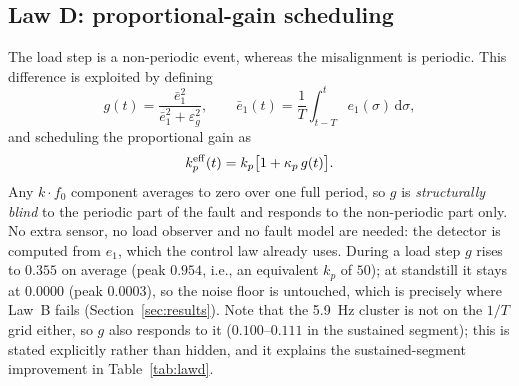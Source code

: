 \documentclass[journal]{IEEEtran}
\theoremstyle{remark}
\begin{document}
\subsection{Law D: proportional-gain scheduling}\label{sec:lawd}
The load step is a non-periodic event, whereas the misalignment is periodic. This
difference is exploited by defining
\begin{equation}
g(t)=\frac{\bar e_1^2}{\bar e_1^2+\varepsilon_g^2},\qquad
\bar e_1(t)=\frac{1}{T}\int_{t-T}^{t}e_1(\sigma)\,\mathrm d\sigma ,
\label{eq:det}
\end{equation}
and scheduling the proportional gain as
\begin{equation}
k_p^{\rm eff}(t)=k_p\big[1+\kappa_p\,g(t)\big].
\label{eq:lawd}
\end{equation}
Any $k\cdot f_0$ component averages to zero over one full period, so $g$ is
\emph{structurally blind} to the periodic part of the fault and responds to the
non-periodic part only. No extra sensor, no load observer and no fault model are
needed: the detector is computed from $e_1$, which the control law already uses.
During a load step $g$ rises to $0.355$ on average (peak $0.954$, i.e., an equivalent
$k_p$ of $50$); at standstill it stays at $0.0000$ (peak $0.0003$), so the noise floor
is untouched, which is precisely where Law~B fails (Section~\ref{sec:results}).
Note that the 5.9~Hz cluster is not on the $1/T$ grid either, so $g$ also responds to
it ($0.100$--$0.111$ in the sustained segment); this is stated explicitly rather than
hidden, and it explains the sustained-segment improvement in Table~\ref{tab:lawd}.
\end{document}
